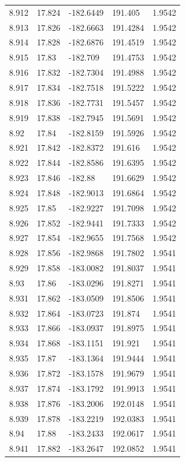 \begin{tabular}{lllll}
8.912 & 17.824 & -182.6449 & 191.405 & 1.9542 \\
8.913 & 17.826 & -182.6663 & 191.4284 & 1.9542 \\
8.914 & 17.828 & -182.6876 & 191.4519 & 1.9542 \\
8.915 & 17.83 & -182.709 & 191.4753 & 1.9542 \\
8.916 & 17.832 & -182.7304 & 191.4988 & 1.9542 \\
8.917 & 17.834 & -182.7518 & 191.5222 & 1.9542 \\
8.918 & 17.836 & -182.7731 & 191.5457 & 1.9542 \\
8.919 & 17.838 & -182.7945 & 191.5691 & 1.9542 \\
8.92 & 17.84 & -182.8159 & 191.5926 & 1.9542 \\
8.921 & 17.842 & -182.8372 & 191.616 & 1.9542 \\
8.922 & 17.844 & -182.8586 & 191.6395 & 1.9542 \\
8.923 & 17.846 & -182.88 & 191.6629 & 1.9542 \\
8.924 & 17.848 & -182.9013 & 191.6864 & 1.9542 \\
8.925 & 17.85 & -182.9227 & 191.7098 & 1.9542 \\
8.926 & 17.852 & -182.9441 & 191.7333 & 1.9542 \\
8.927 & 17.854 & -182.9655 & 191.7568 & 1.9542 \\
8.928 & 17.856 & -182.9868 & 191.7802 & 1.9541 \\
8.929 & 17.858 & -183.0082 & 191.8037 & 1.9541 \\
8.93 & 17.86 & -183.0296 & 191.8271 & 1.9541 \\
8.931 & 17.862 & -183.0509 & 191.8506 & 1.9541 \\
8.932 & 17.864 & -183.0723 & 191.874 & 1.9541 \\
8.933 & 17.866 & -183.0937 & 191.8975 & 1.9541 \\
8.934 & 17.868 & -183.1151 & 191.921 & 1.9541 \\
8.935 & 17.87 & -183.1364 & 191.9444 & 1.9541 \\
8.936 & 17.872 & -183.1578 & 191.9679 & 1.9541 \\
8.937 & 17.874 & -183.1792 & 191.9913 & 1.9541 \\
8.938 & 17.876 & -183.2006 & 192.0148 & 1.9541 \\
8.939 & 17.878 & -183.2219 & 192.0383 & 1.9541 \\
8.94 & 17.88 & -183.2433 & 192.0617 & 1.9541 \\
8.941 & 17.882 & -183.2647 & 192.0852 & 1.9541 \\

\end{tabular}
